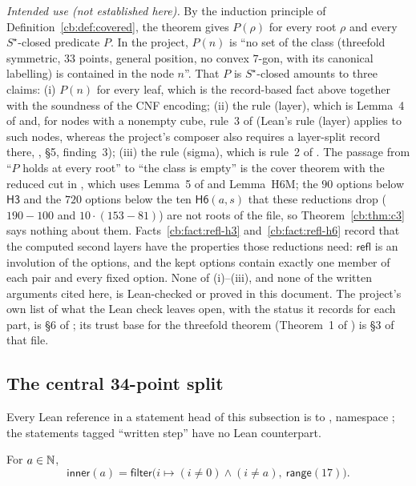 \begin{remark}
\emph{Intended use (not established here).} By the induction principle of Definition~\ref{cb:def:covered}, the theorem
gives $P(\rho)$ for every root $\rho$ and every $S^\star$-closed predicate $P$. In the project, $P(n)$ is ``no set of
the class (threefold symmetric, 33 points, general position, no convex $7$-gon, with its canonical labelling) is
contained in the node $n$''. That $P$ is $S^\star$-closed amounts to three claims: (i) $P(n)$ for every leaf, which is
the record-based fact above together with the soundness of the CNF encoding; (ii) the rule (layer), which is Lemma~4
of  and, for nodes with a nonempty cube, rule~3 of  (Lean's rule
(layer) applies to such nodes, whereas the project's composer  also requires a layer-split
record there, , \S5, finding~3); (iii) the rule (sigma), which is rule~2 of
. The passage from ``$P$ holds at every root'' to ``the class is empty'' is the cover
theorem with the reduced cut in , which uses Lemma~5 of  and
Lemma~H6M; the $90$ options below $\mathsf{H3}$ and the $720$ options below the ten $\mathsf{H6}(a,s)$ that these
reductions drop ($190-100$ and $10\cdot(153-81)$) are not roots of the file, so Theorem~\ref{cb:thm:c3} says nothing
about them. Facts~\ref{cb:fact:refl-h3}
and~\ref{cb:fact:refl-h6} record that the computed second layers have the properties those reductions need:
$\mathsf{refl}$ is an involution of the options, and the kept options contain exactly one member of each pair and every
fixed option. None of (i)--(iii), and none of the written arguments cited here, is Lean-checked or proved in this
document. The project's own list of what the Lean check leaves open, with the status it records for each part, is
\S6 of ; its trust base for the threefold theorem (Theorem~1 of
) is \S3 of that file.
\end{remark}

\subsection{The central 34-point split}\label{cb:sec:c2}

Every Lean reference in a statement head of this subsection is to , namespace
; the statements tagged ``written step'' have no Lean counterpart.

\begin{definition}\label{cb:def:inner}
For $a\in\mathbb N$,
\[
\mathsf{inner}(a)=\mathsf{filter}\big(i\mapsto(i\ne0)\wedge(i\ne a),\ \mathsf{range}(17)\big).
\]
\end{definition}

